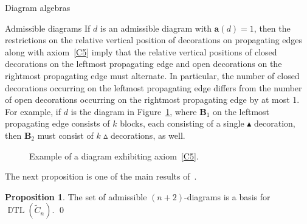 \documentclass[11pt]{amsart}
\theoremstyle{definition}
\newtheorem{proposition}[theorem]{Proposition}
\numberwithin{equation}{section}
\newcommand{\C}{\widetilde{C}}
\newcommand{\x}{\mathsf{x}}
\newcommand{\wtri}{\vartriangle}
\newcommand{\btri}{\blacktriangle}
\renewcommand{\a}{\mathbf{a}}
\DeclareMathOperator{\DTL}{\mathbb{D}TL}
\renewcommand{\(}{\left(}
\renewcommand{\)}{\right)}
\begin{document}
\begin{section}{Diagram algebras}
\begin{subsection}{Admissible diagrams}
If $d$ is an admissible diagram with $\a(d)=1$, then the restrictions on the relative vertical position of decorations on propagating edges along with axiom~\ref{C5} imply that the relative vertical positions of closed decorations on the leftmost propagating edge and open decorations on the rightmost propagating edge must alternate.  In particular, the number of closed decorations occurring on the leftmost propagating edge differs from the number of open decorations occurring on the rightmost propagating edge by at most 1.  For example, if $d$ is the diagram in Figure~\ref{fig:example C5}, where $\mathbf{B}_1$ on the leftmost propagating edge consists of $k$ blocks, each consisting of a single $\btri$ decoration, then $\mathbf{B}_2$ must consist of $k$ $\wtri$ decorations, as well. 

\begin{figure}[!ht]
\caption{Example of a diagram exhibiting axiom~\ref{C5}.}\label{fig:example C5}
\end{figure}

The next proposition is one of the main results of~\cite{Ernst2012}.

\begin{proposition}\label{prop:admissibles basis for D_n}
The set of admissible $(n+2)$-diagrams is a basis for $\DTL(\C_n)$. \qed
\end{proposition}

\end{subsection}

\end{section}

\end{document}
